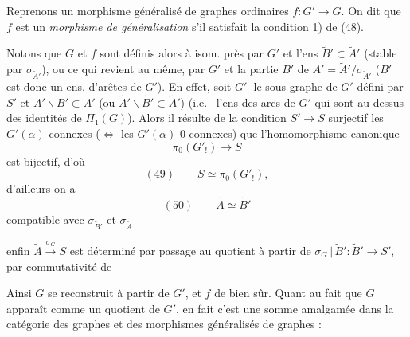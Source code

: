 \documentclass[11pt,a4paper]{article}
\begin{document}

Reprenons un morphisme généralisé de graphes ordinaires $f : G' \to G$. On dit que $f$ est un \emph{morphisme de généralisation} s'il satisfait la condition 1) de (48).

Notons que $G$ et $f$ sont définis alors à isom. près par $G'$ et l'ens $\widetilde{B}' \subset \widetilde{A}'$ (stable par $\sigma_{\widetilde{A}'}$), ou ce qui revient au même, par $G'$ et la \struck{\ill{}} partie $B'$ de $A' = \widetilde{A}'/\sigma_{\widetilde{A}'}$ ($B'$ est donc un ens. d'arêtes de $G'$). En effet, soit $G'_{!}$ le sous-graphe de $G'$ défini par $S'$ et $A' \smallsetminus B' \subset A'$ (ou $\widetilde{A}' \smallsetminus \widetilde{B}' \subset \widetilde{A}'$) (i.e.\  l'ens des  arcs de $G'$ qui sont au dessus des identités de $\Pi_1(G)$). Alors il résulte de la condition $S' \to S$ surjectif  les $G'(\alpha)$ connexes (\(\Leftrightarrow\) les $G'(\alpha)$ $0$-connexes) que  l'homomorphisme canonique
\[
\pi_0(G'_{!}) \longrightarrow S
\]
est bijectif, d'où
\[
(49)\qquad S \simeq \pi_0(G'_{!}),
\]
d'ailleurs on a
\[
(50)\qquad \widetilde{A} \simeq \widetilde{B}'
\]
compatible avec $\sigma_{\widetilde{B}'}$ et $\sigma_{\widetilde{A}}$

enfin $\widetilde{A} \xrightarrow{\sigma_G} S$ est déterminé par passage au quotient à partir de $\sigma_G \,|\, \widetilde{B}' : \widetilde{B}' \to S'$, par commutativité de



Ainsi $G$ se reconstruit à partir de $G'$, et $f$ de \struck{\ill{}} bien sûr. Quant au fait que $G$ apparaît comme un quotient de $G'$, en fait c'est  une somme amalgamée dans la catégorie des graphes et des morphismes généralisés de graphes :

\end{document}
